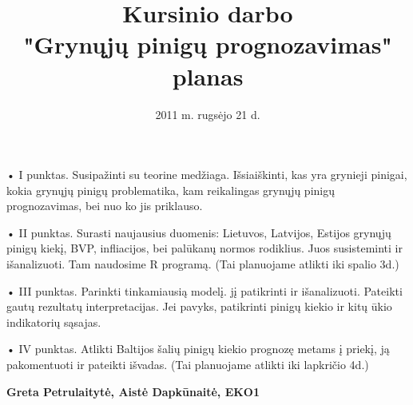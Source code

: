 \documentclass[a4paper]{article}
\title{\textbf{Kursinio darbo \\ "Grynųjų pinigų prognozavimas" planas}}
\date{2011 m. rugsėjo 21 d.}
\begin{document}
\maketitle
\maketitle


\begin{flushleft}
• I punktas. Susipažinti su teorine medžiaga. Išsiaiškinti, kas yra grynieji pinigai, kokia grynųjų pinigų problematika, kam reikalingas grynųjų pinigų prognozavimas, bei nuo ko jis priklauso. 
\end{flushleft}

\medskip


\begin{flushleft}
• II punktas. Surasti naujausius duomenis: Lietuvos, Latvijos, Estijos grynųjų pinigų kiekį, BVP, infliacijos, bei palūkanų normos rodiklius. Juos susisteminti ir išanalizuoti. Tam naudosime R programą. (Tai planuojame atlikti iki spalio 3d.)
\end{flushleft}

\medskip

\begin{flushleft}
• III punktas. Parinkti tinkamiausią modelį. jį patikrinti ir išanalizuoti. Pateikti gautų rezultatų interpretacijas. Jei pavyks, patikrinti pinigų kiekio ir kitų ūkio indikatorių sąsajas.
\end{flushleft}

\medskip

\begin{flushleft}
• IV punktas. Atlikti Baltijos šalių pinigų kiekio prognozę metams į priekį, ją pakomentuoti ir pateikti išvadas. (Tai planuojame atlikti iki lapkričio 4d.)
\end{flushleft}

\medskip
\medskip
\medskip
\medskip
\medskip
\medskip
\medskip
\begin{flushright}
\textbf{Greta Petrulaitytė, Aistė Dapkūnaitė, EKO1}
\end{flushright}
\end{document}
